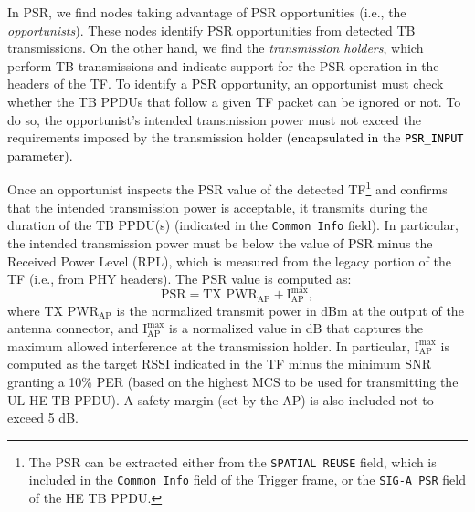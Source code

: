 \documentclass[preprint,12pt]{elsarticle}
\theoremstyle{plain}
\begin{document}
In PSR, we find nodes taking advantage of PSR opportunities (i.e., the \emph{opportunists}). These nodes identify PSR opportunities from detected TB transmissions. On the other hand, we find the \emph{transmission holders}, which perform TB transmissions and indicate support for the PSR operation in the headers of the TF. To identify a PSR opportunity, an opportunist must check whether the TB PPDUs that follow a given TF packet can be ignored or not. To do so, the opportunist's intended transmission power must not exceed the requirements imposed by the transmission holder \textcolor{black}{(encapsulated in the \texttt{PSR\_INPUT} parameter).} 

Once an opportunist inspects the PSR value of the detected TF\footnote{The PSR can be extracted either from the \texttt{SPATIAL REUSE} field, which is included in the \texttt{Common Info} field of the Trigger frame, or the \texttt{SIG-A PSR} field of the HE TB PPDU.} and confirms that the intended transmission power is acceptable, it transmits during the duration of the TB PPDU(s) (indicated in the \texttt{Common Info} field). In particular, the intended transmission power must be below the value of PSR minus the Received Power Level (RPL), which is measured from the legacy portion of the TF (i.e., from PHY headers). The PSR value is computed as:
\begin{equation}
\text{PSR} = \text{TX PWR}_\text{AP} + \text{I}_\text{AP}^{\max},
\label{eq:srp_input}
\nonumber
\end{equation}
where $\text{TX PWR}_\text{AP}$ is the normalized transmit power in dBm at the output of the antenna connector, and $\text{I}_\text{AP}^{\max}$ is a normalized value in dB that captures the maximum allowed interference at the transmission holder. In particular, $\text{I}_\text{AP}^{\max}$ is computed as the target RSSI indicated in the TF minus the minimum SNR granting a 10\% PER (based on the highest MCS to be used for transmitting the UL HE TB PPDU). A safety margin (set by the AP) is also included not to exceed 5 dB.
\end{document}
